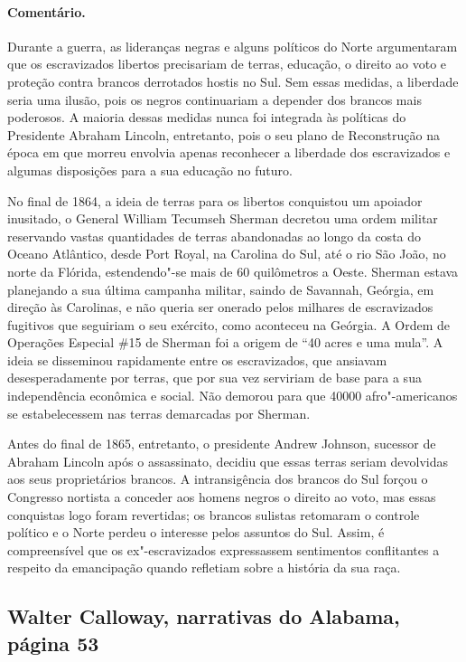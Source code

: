 \paragraph{Comentário.}\quad
{\small
Durante a guerra, as lideranças negras e alguns políticos do Norte
argumentaram que os escravizados libertos precisariam de terras, educação, o
direito ao voto e proteção contra brancos derrotados hostis no Sul. Sem
essas medidas, a liberdade seria uma ilusão, pois os negros continuariam
a depender dos brancos mais poderosos. A maioria dessas medidas nunca
foi integrada às políticas do Presidente Abraham Lincoln, entretanto,
pois o seu plano de Reconstrução na época em que morreu envolvia apenas
reconhecer a liberdade dos escravizados e algumas disposições para a sua
educação no futuro.

No final de 1864, a ideia de terras para os libertos conquistou um
apoiador inusitado, o General William Tecumseh Sherman decretou uma
ordem militar reservando vastas quantidades de terras abandonadas ao
longo da costa do Oceano Atlântico, desde Port Royal, na Carolina do
Sul, até o rio São João, no norte da Flórida, estendendo"-se mais de 60
quilômetros a Oeste. Sherman estava planejando a sua última campanha militar,
saindo de Savannah, Geórgia, em direção às Carolinas, e não queria ser
onerado pelos milhares de escravizados fugitivos que seguiriam o seu
exército, como aconteceu na Geórgia. A Ordem de Operações Especial \#15
de Sherman foi a origem de ``40 acres e uma mula''. A ideia se
disseminou rapidamente entre os escravizados, que ansiavam desesperadamente
por terras, que por sua vez serviriam de base para a sua independência
econômica e social. Não demorou para que 40000 afro"-americanos se
estabelecessem nas terras demarcadas por Sherman.

Antes do final de 1865, entretanto, o presidente Andrew Johnson,
sucessor de Abraham Lincoln após o assassinato, decidiu que essas terras
seriam devolvidas aos seus proprietários brancos. A intransigência dos
brancos do Sul forçou o Congresso nortista a conceder aos homens negros
o direito ao voto, mas essas conquistas logo foram revertidas; os
brancos sulistas retomaram o controle político e o Norte perdeu o
interesse pelos assuntos do Sul. Assim, é compreensível que os
ex"-escravizados expressassem sentimentos conflitantes a respeito da
emancipação quando refletiam sobre a história da sua raça.
}

\subsection{Walter Calloway, narrativas do Alabama, página 53} \label{ref43}

